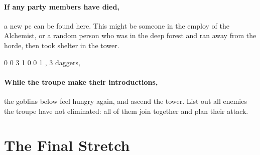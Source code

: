 \begin{multicols}{2}

\paragraph{If any party members have died,}
a new \gls{pc} can be found here.
This might be someone in the employ of the Alchemist, or a random person who was in the deep forest and ran away from the horde, then took shelter in the tower.

{0}%
{0}%
{{3}%
{1}%
{0}}%
{0}%
{1}%
{\setcounter{Projectiles}{1}\setcounter{Academics}{2}\setcounter{Crafts}{1}\setcounter{Deceit}{1}\setcounter{Medicine}{2}\setcounter{Vigilance}{1}}%
{\shortsword, 3 daggers, \partialleather}%
{
  \addtocounter{fp}{10}
  \setcounter{Fire}{3}
  \setcounter{Air}{2}
  \setcounter{Earth}{1}
}

\showStdSpells

\paragraph{While the troupe make their introductions,}
the goblins below feel hungry again, and ascend the tower.
List out all enemies the troupe have not eliminated: all of them join together and plan their attack.

\end{multicols}

\section{The Final Stretch}

